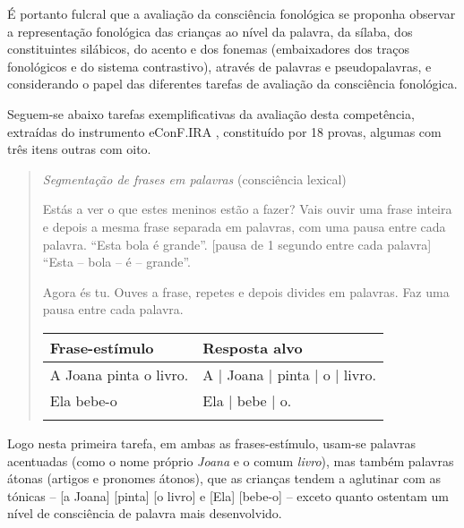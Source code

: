 \documentclass[output=paper,colorlinks,citecolor=brown,booklanguage=portuguese]{langscibook}
\begin{document}
É portanto fulcral que a avaliação da consciência fonológica se proponha observar a representação fonológica das crianças ao nível da palavra, da sílaba, dos constituintes silábicos, do acento e dos fonemas (embaixadores dos traços fonológicos e do sistema contrastivo), através de palavras e pseudopalavras, e considerando o papel das diferentes tarefas de avaliação da consciência fonológica.

Seguem-se abaixo tarefas exemplificativas da avaliação desta competência, extraídas do instrumento eConF.IRA \citep{Castronoprelo}, constituído por 18 provas, algumas com três itens outras com oito.

\begin{quote}
\textit{Segmentação de frases em palavras} (consciência lexical)

 Estás a ver o que estes meninos estão a fazer? Vais ouvir uma frase inteira e depois a mesma frase separada em palavras, com uma pausa entre cada palavra. “Esta bola é grande”. [pausa de 1 segundo entre cada palavra] “Esta – bola – é – grande”.

 Agora és tu. Ouves a frase, repetes e depois divides em palavras. Faz uma pausa entre cada palavra.


 \begin{Tabela}
 \begin{tabularx}{.8\textwidth}{Xl}
 \lsptoprule
 \textbf{Frase-estímulo} & \textbf{Resposta alvo}\\
 \midrule
 A Joana pinta o livro. & A | Joana | pinta | o | livro.\\
 Ela bebe-o & Ela | bebe | o.\\
 \lspbottomrule
 \end{tabularx}
 \end{Tabela}
 
 \end{quote}


 Logo nesta primeira tarefa, em ambas as frases-estímulo, usam-se palavras acentuadas (como o nome próprio \emph{Joana} e o comum \emph{livro}), mas também palavras átonas (artigos e pronomes átonos), que as crianças tendem a aglutinar com as tónicas \citep{Rios2009, Afonso2015} -- [a Joana] [pinta] [o livro] e [Ela] [bebe-o] -- exceto quanto ostentam um nível de consciência de palavra mais desenvolvido. 
\end{document}
